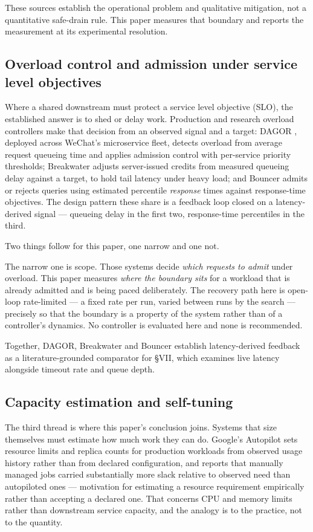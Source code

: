\documentclass{ieeeaccess}
\begin{document}
These sources establish the operational problem and qualitative mitigation, not a quantitative safe-drain rule. This paper measures that boundary and reports the measurement at its experimental resolution.

\subsection{Overload control and admission under service level objectives}

Where a shared downstream must protect a service level objective (SLO), the established answer is to shed or delay work. Production and research overload controllers make that decision from an observed signal and a target: DAGOR \cite{dagor}, deployed across WeChat's microservice fleet, detects overload from average request queueing time and applies admission control with per-service priority thresholds; Breakwater \cite{breakwater} adjusts server-issued credits from measured queueing delay against a target, to hold tail latency under heavy load; and Bouncer \cite{bouncer} admits or rejects queries using estimated percentile \textit{response} times against response-time objectives. The design pattern these share is a feedback loop closed on a latency-derived signal --- queueing delay in the first two, response-time percentiles in the third.

Two things follow for this paper, one narrow and one not.

The narrow one is scope. Those systems decide \textit{which requests to admit} under overload. This paper measures \textit{where the boundary sits} for a workload that is already admitted and is being paced deliberately. The recovery path here is open-loop rate-limited --- a fixed rate per run, varied between runs by the search --- precisely so that the boundary is a property of the system rather than of a controller's dynamics. No controller is evaluated here and none is recommended.

Together, DAGOR, Breakwater and Bouncer establish latency-derived feedback as a literature-grounded comparator for \S{}VII, which examines live latency alongside timeout rate and queue depth.

\subsection{Capacity estimation and self-tuning}

The third thread is where this paper's conclusion joins. Systems that size themselves must estimate how much work they can do. Google's Autopilot \cite{autopilot} sets resource limits and replica counts for production workloads from observed usage history rather than from declared configuration, and reports that manually managed jobs carried substantially more slack relative to observed need than autopiloted ones --- motivation for estimating a resource requirement empirically rather than accepting a declared one. That concerns CPU and memory limits rather than downstream service capacity, and the analogy is to the practice, not to the quantity.
\end{document}
